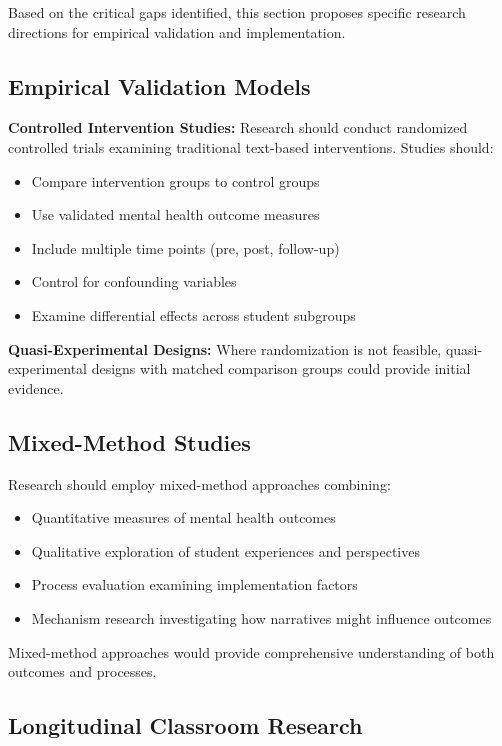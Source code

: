 \documentclass[12pt,a4paper,twocolumn]{article}
\begin{document}
Based on the critical gaps identified, this section proposes specific research directions for empirical validation and implementation.

\subsection{Empirical Validation Models}

\textbf{Controlled Intervention Studies:} Research should conduct randomized controlled trials examining traditional text-based interventions. Studies should:
\begin{itemize}
    \item Compare intervention groups to control groups
    \item Use validated mental health outcome measures
    \item Include multiple time points (pre, post, follow-up)
    \item Control for confounding variables
    \item Examine differential effects across student subgroups
\end{itemize}

\textbf{Quasi-Experimental Designs:} Where randomization is not feasible, quasi-experimental designs with matched comparison groups could provide initial evidence.

\subsection{Mixed-Method Studies}

Research should employ mixed-method approaches combining:
\begin{itemize}
    \item Quantitative measures of mental health outcomes
    \item Qualitative exploration of student experiences and perspectives
    \item Process evaluation examining implementation factors
    \item Mechanism research investigating how narratives might influence outcomes
\end{itemize}

Mixed-method approaches would provide comprehensive understanding of both outcomes and processes.

\subsection{Longitudinal Classroom Research}
\end{document}
